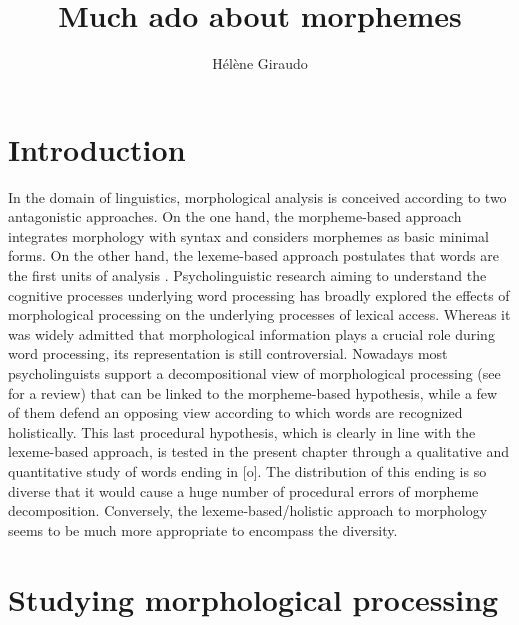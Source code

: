 \documentclass[output=paper]{langsci/langscibook}
\title{Much ado about morphemes}
\author{Hélène Giraudo\affiliation{CLLE, Université de Toulouse, CNRS, Toulouse, France}}
\begin{document}

\section{Introduction}\label{section:Giraudo:introduction}

In the domain of linguistics, morphological analysis is conceived
according to two antagonistic approaches. On the one hand, the
morpheme-based approach %
\citep[exemplified by the theoretical framework of Distributed Morphology, see][]{Halle1993,HalleMarantz1994}
%
%
 integrates
morphology with syntax and considers morphemes as basic minimal forms.
On the other hand, the lexeme-based approach postulates that words are
the first units of analysis %
\citep[e.g.][]{Corbin87,Aronoff94,Fradin1996}
. Psycholinguistic research aiming to understand the cognitive
processes underlying word processing has broadly explored the effects of
morphological processing on the underlying processes of lexical access.
Whereas it was widely admitted that morphological information plays a
crucial role during word processing, its representation is still
controversial. Nowadays most psycholinguists support a
decompositional view of morphological processing %
(see 
\citealt{RastleDavis2008} %
for a review)
%
%
 that can be linked to the morpheme-based hypothesis,
while a few of them defend an opposing view according to which words are
recognized holistically. This last procedural hypothesis, which is
clearly in line with the lexeme-based approach, is tested in the present
chapter through a qualitative and quantitative study of words ending
in {[}o{]}. The distribution of this ending is so diverse
that it would cause a huge number of procedural errors of morpheme
decomposition. Conversely, the lexeme-based/holistic approach to morphology seems to
be much more appropriate to encompass the diversity.

\section{Studying morphological processing
}\label{studying-morphological-processing}
\end{document}
